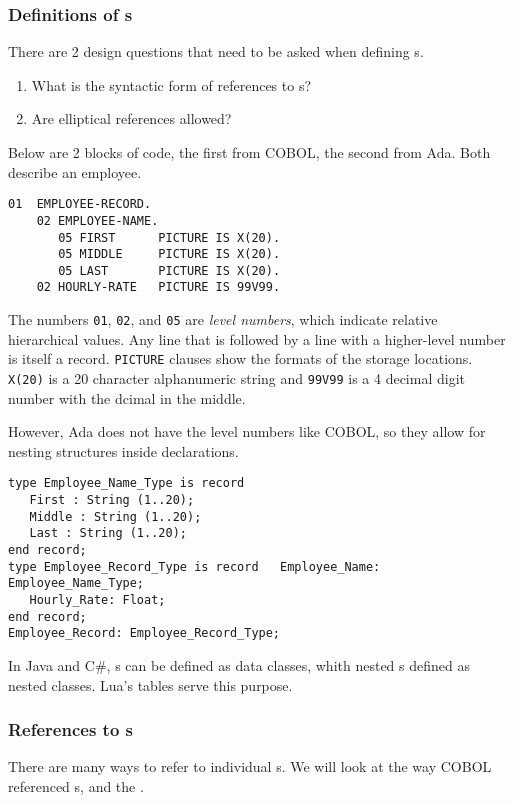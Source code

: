 \subsubsection{Definitions of s}\label{subsubsec:Definitions_of_Records}
There are 2 design questions that need to be asked when defining s.
\begin{enumerate}[noitemsep]
\item What is the syntactic form of references to s?
\item Are elliptical references allowed?
\end{enumerate}

Below are 2 blocks of code, the first from COBOL, the second from Ada.
Both describe an employee.

\begin{verbatim}
01  EMPLOYEE-RECORD.
    02 EMPLOYEE-NAME.
       05 FIRST      PICTURE IS X(20).
       05 MIDDLE     PICTURE IS X(20).
       05 LAST       PICTURE IS X(20).
    02 HOURLY-RATE   PICTURE IS 99V99.
\end{verbatim}
The numbers \texttt{01}, \texttt{02}, and \texttt{05} are \emph{level numbers}, which indicate relative hierarchical values.
Any line that is followed by a line with a higher-level number is itself a record.
\texttt{PICTURE} clauses show the formats of the storage locations.
\texttt{X(20)} is a 20 character alphanumeric string and \texttt{99V99} is a 4 decimal digit number with the dcimal in the middle.

However, Ada does not have the level numbers like COBOL, so they allow for nesting  structures inside  declarations.
\begin{verbatim}
type Employee_Name_Type is record
   First : String (1..20);
   Middle : String (1..20);
   Last : String (1..20);
end record;
type Employee_Record_Type is record   Employee_Name: Employee_Name_Type;
   Hourly_Rate: Float;
end record;
Employee_Record: Employee_Record_Type;
\end{verbatim}

In Java and C\#, s can be defined as data classes, whith nested s defined as nested classes.
Lua's tables serve this purpose.

\subsubsection{References to  s}\label{subsubsec:References_to_Record_Fields}
There are many ways to refer to individual s.
We will look at the way COBOL referenced s, and the .

